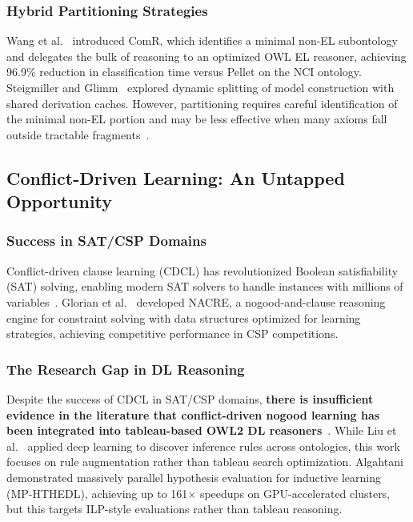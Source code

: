 \subsubsection{Hybrid Partitioning Strategies}

Wang et al.~\cite{wang2019comr} introduced ComR, which identifies a minimal non-EL subontology and delegates the bulk of reasoning to an optimized OWL EL reasoner, achieving 96.9\% reduction in classification time versus Pellet on the NCI ontology. Steigmiller and Glimm~\cite{steigmiller2020parallelised} explored dynamic splitting of model construction with shared derivation caches. However, partitioning requires careful identification of the minimal non-EL portion and may be less effective when many axioms fall outside tractable fragments~\cite{wang2019comr}.

\subsection{Conflict-Driven Learning: An Untapped Opportunity}

\subsubsection{Success in SAT/CSP Domains}

Conflict-driven clause learning (CDCL) has revolutionized Boolean satisfiability (SAT) solving, enabling modern SAT solvers to handle instances with millions of variables~\cite{marques1999grasp}. Glorian et al.~\cite{glorian2020nacre} developed NACRE, a nogood-and-clause reasoning engine for constraint solving with data structures optimized for learning strategies, achieving competitive performance in CSP competitions.

\subsubsection{The Research Gap in DL Reasoning}

Despite the success of CDCL in SAT/CSP domains, \textbf{there is insufficient evidence in the literature that conflict-driven nogood learning has been integrated into tableau-based OWL2 DL reasoners}~\cite{glorian2020nacre}. While Liu et al.~\cite{liu2019deep} applied deep learning to discover inference rules across ontologies, this work focuses on rule augmentation rather than tableau search optimization. Algahtani~\cite{algahtani2024mp} demonstrated massively parallel hypothesis evaluation for inductive learning (MP-HTHEDL), achieving up to 161$\times$ speedups on GPU-accelerated clusters, but this targets ILP-style evaluations rather than tableau reasoning.

